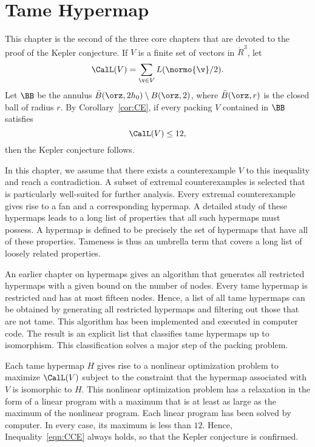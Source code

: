 

\chapter{Tame Hypermap}
%

\label{sec:tame}
%

\begin{summary}
  This chapter is the second of the three core chapters that are devoted
  to the proof of the Kepler conjecture.  If $V$ is a finite set of
  vectors in $\ring{R}^3$, let
  \[ \CalL(V) = \sum_{\v\in V}
    L(\normo{\v}/2).\] 
Let $\BB$ be the
annulus $\bar B(\orz,2h_0)\setminus B(\orz,2)$, where
$\bar B(\orz,r)$ is the closed ball of radius $r$.
By Corollary~\ref{cor:CE}, if every packing $V$
contained in $\BB$
satisfies
\begin{equation}\label{eqn:CCE}
\CalL(V) \le 12,
\end{equation}
then the Kepler conjecture follows.

In this chapter, we assume that there exists a counterexample $V$ to this
inequality and reach a contradiction.  A subset of extremal
counterexamples  is selected that is particularly well-suited for
further analysis.  Every extremal counterexample gives rise to a fan
and a corresponding hypermap.  A detailed study of these hypermaps
leads to a long list of properties that all such hypermaps must
possess.  A  hypermap is defined to be precisely the set
of hypermaps that have all of these properties.  Tameness is thus an
umbrella term that covers a long list of loosely related properties.

An earlier chapter on hypermaps gives an algorithm that generates all
restricted hypermaps with a given bound on the number of nodes.
Every tame hypermap is restricted and has at most fifteen nodes.  Hence, a
list of all tame hypermaps can be obtained by generating all
restricted hypermaps and filtering out those that are not tame.  This
algorithm has been implemented and executed in computer code.  The result
 is an explicit list that classifies tame hypermaps
up to isomorphism.  This classification solves a major step of the
packing problem.

Each tame hypermap $H$ gives rise to a nonlinear optimization problem to
maximize $\CalL(V)$ subject to the constraint that the hypermap
associated with $V$ is isomorphic to $H$.  This nonlinear optimization
problem has a relaxation in the form of a linear program with a maximum that
 is at least as large as the maximum of the nonlinear program.
Each linear program has been solved by computer.  In every case, its
maximum is less than $12$.  Hence, Inequality~\ref{eqn:CCE}
always holds, so that the Kepler conjecture is confirmed.
\end{summary}
%
%



